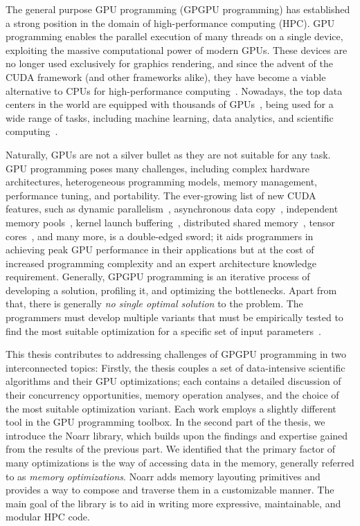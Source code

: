 
The general purpose GPU programming (GPGPU programming) has established a strong position in the domain of high-performance computing (HPC).
GPU programming enables the parallel execution of many threads on a single device, exploiting the massive computational power of modern GPUs.
These devices are no longer used exclusively for graphics rendering, and since the advent of the CUDA framework (and other frameworks alike), they have become a viable alternative to CPUs for high-performance computing~\cite{khairy2019survey}.
Nowadays, the top data centers in the world are equipped with thousands of GPUs~\cite{top500}, being used for a wide range of tasks, including machine learning, data analytics, and scientific computing~\cite{mittal2019survey,bress2014gpu,kalaiselvi2017survey}.

Naturally, GPUs are not a silver bullet as they are not suitable for any task.
GPU programming poses many challenges, including complex hardware architectures, heterogeneous programming models, memory management, performance tuning, and portability.
The ever-growing list of new CUDA features, such as dynamic parallelism~\cite{wang2014characterization}, asynchronous data copy~\cite{pearson2019evaluating}, independent memory pools~\cite{qian2023empirical}, kernel launch buffering~\cite{lin2021efficient}, distributed shared memory~\cite{choquette2023nvidia}, tensor cores~\cite{dakkak2019accelerating}, and many more, is a double-edged sword;
it aids programmers in achieving peak GPU performance in their applications but at the cost of increased programming complexity and an expert architecture knowledge requirement.
Generally, GPGPU programming is an iterative process of developing a solution, profiling it, and optimizing the bottlenecks.
Apart from that, there is generally \emph{no single optimal solution} to the problem. The programmers must develop multiple variants that must be empirically tested to find the most suitable optimization for a specific set of input parameters~\cite{hijma2023optimization}.

This thesis contributes to addressing challenges of GPGPU programming in two interconnected topics:
Firstly, the thesis couples a set of data-intensive scientific algorithms and their GPU optimizations; each contains a detailed discussion of their concurrency opportunities, memory operation analyses, and the choice of the most suitable optimization variant. Each work employs a slightly different tool in the GPU programming toolbox.
In the second part of the thesis, we introduce the Noarr library, which builds upon the findings and expertise gained from the results of the previous part. We identified that the primary factor of many optimizations is the way of accessing data in the memory, generally referred to as \emph{memory optimizations}.
Noarr adds memory layouting primitives and provides a way to compose and traverse them in a customizable manner. The main goal of the library is to aid in writing more expressive, maintainable, and modular HPC code.

